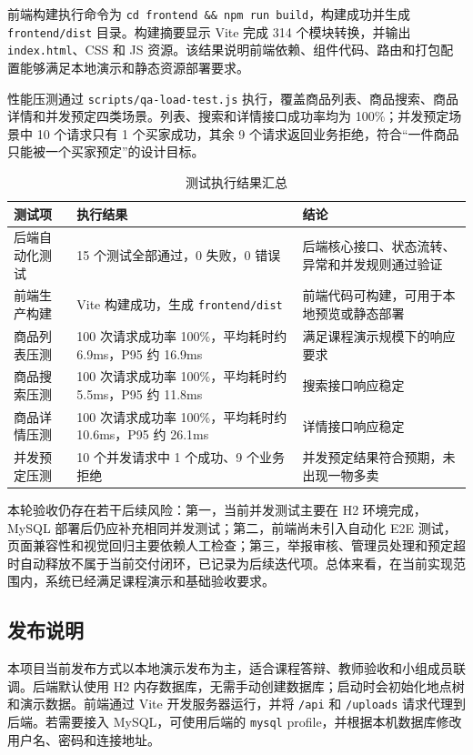 ﻿\documentclass[UTF8,a4paper,12pt]{ctexart}
\begin{document}
前端构建执行命令为 \texttt{cd frontend \&\& npm run build}，构建成功并生成 \texttt{frontend/dist} 目录。构建摘要显示 Vite 完成 314 个模块转换，并输出 \texttt{index.html}、CSS 和 JS 资源。该结果说明前端依赖、组件代码、路由和打包配置能够满足本地演示和静态资源部署要求。

性能压测通过 \texttt{scripts/qa-load-test.js} 执行，覆盖商品列表、商品搜索、商品详情和并发预定四类场景。列表、搜索和详情接口成功率均为 100\%；并发预定场景中 10 个请求只有 1 个买家成功，其余 9 个请求返回业务拒绝，符合“一件商品只能被一个买家预定”的设计目标。

\begin{table}[H]
  \centering
  \caption{测试执行结果汇总}
  \begin{tabular}{p{3.2cm}p{4.8cm}p{5.2cm}}
    \toprule
    测试项 & 执行结果 & 结论 \\
    \midrule
    后端自动化测试 & 15 个测试全部通过，0 失败，0 错误 & 后端核心接口、状态流转、异常和并发规则通过验证 \\
    前端生产构建 & Vite 构建成功，生成 \texttt{frontend/dist} & 前端代码可构建，可用于本地预览或静态部署 \\
    商品列表压测 & 100 次请求成功率 100\%，平均耗时约 6.9ms，P95 约 16.9ms & 满足课程演示规模下的响应要求 \\
    商品搜索压测 & 100 次请求成功率 100\%，平均耗时约 5.5ms，P95 约 11.8ms & 搜索接口响应稳定 \\
    商品详情压测 & 100 次请求成功率 100\%，平均耗时约 10.6ms，P95 约 26.1ms & 详情接口响应稳定 \\
    并发预定压测 & 10 个并发请求中 1 个成功、9 个业务拒绝 & 并发预定结果符合预期，未出现一物多卖 \\
    \bottomrule
  \end{tabular}
\end{table}

本轮验收仍存在若干后续风险：第一，当前并发测试主要在 H2 环境完成，MySQL 部署后仍应补充相同并发测试；第二，前端尚未引入自动化 E2E 测试，页面兼容性和视觉回归主要依赖人工检查；第三，举报审核、管理员处理和预定超时自动释放不属于当前交付闭环，已记录为后续迭代项。总体来看，在当前实现范围内，系统已经满足课程演示和基础验收要求。

\subsection{发布说明}
本项目当前发布方式以本地演示发布为主，适合课程答辩、教师验收和小组成员联调。后端默认使用 H2 内存数据库，无需手动创建数据库；启动时会初始化地点树和演示数据。前端通过 Vite 开发服务器运行，并将 \texttt{/api} 和 \texttt{/uploads} 请求代理到后端。若需要接入 MySQL，可使用后端的 \texttt{mysql} profile，并根据本机数据库修改用户名、密码和连接地址。
\end{document}
